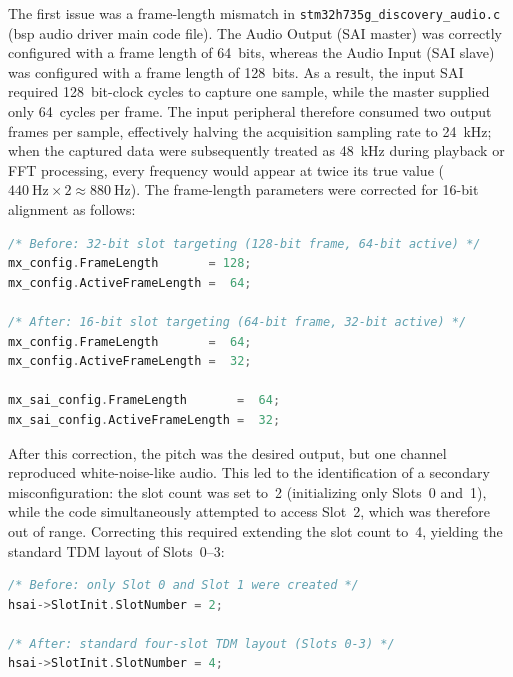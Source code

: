 The first issue was a frame-length mismatch in \texttt{stm32h735g\_disco\-very\_audio.c} (\acrshort{bsp} audio driver main code file). The Audio Output (SAI master) was correctly configured with a frame length of 64~bits, whereas the Audio Input (SAI slave) was configured with a frame length of 128~bits. As a result, the input SAI required 128~bit-clock cycles to capture one sample, while the master supplied only 64~cycles per frame. The input peripheral therefore consumed two output frames per sample, effectively halving the acquisition sampling rate to \SI{24}{\kHz}; when the captured data were subsequently treated as \SI{48}{\kHz} during playback or FFT processing, every frequency would appear at twice its true value ($\SI{440}{\Hz} \times 2 \approx \SI{880}{\Hz}$). The frame-length parameters were corrected for 16-bit alignment as follows:

\begin{lstlisting}[language=C,
  caption={Frame-length parameter corrections for 16-bit alignment in
           \texttt{BSP\_AUDIO\_IN\_Init()}.}]
/* Before: 32-bit slot targeting (128-bit frame, 64-bit active) */
mx_config.FrameLength       = 128;
mx_config.ActiveFrameLength =  64;

/* After: 16-bit slot targeting (64-bit frame, 32-bit active) */
mx_config.FrameLength       =  64;
mx_config.ActiveFrameLength =  32;

mx_sai_config.FrameLength       =  64;
mx_sai_config.ActiveFrameLength =  32;
\end{lstlisting}

After this correction, the pitch was the desired output, but one channel reproduced white-noise-like audio. This led to the identification of a secondary misconfiguration: the slot count was set to~2 (initializing only Slots~0 and~1), while the code simultaneously attempted to access Slot~2, which was therefore out of range. Correcting this required extending the slot count to~4, yielding the standard TDM layout of Slots~0--3:

\begin{lstlisting}[language=C,
  caption={Slot count correction in \texttt{MX\_SAI1\_Block\_A\_Init}
           (line~1184 of \texttt{stm32h735g\_discovery\_audio.c}).}]
/* Before: only Slot 0 and Slot 1 were created */
hsai->SlotInit.SlotNumber = 2;

/* After: standard four-slot TDM layout (Slots 0-3) */
hsai->SlotInit.SlotNumber = 4;
\end{lstlisting}

